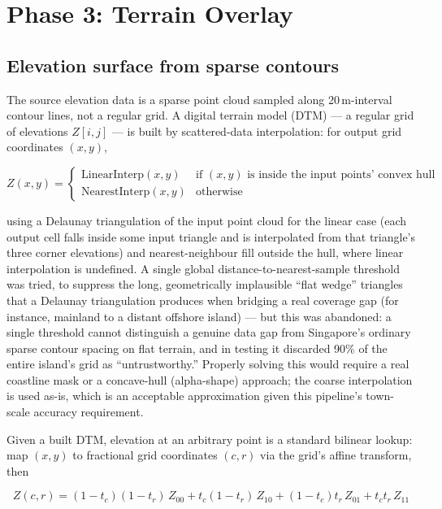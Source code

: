 \documentclass[11pt]{article}
\begin{document}
\section{Phase 3: Terrain Overlay}
\label{sec:terrain}

\subsection{Elevation surface from sparse contours}

The source elevation data is a sparse point cloud sampled along 20\,m-interval contour lines,
not a regular grid. A digital terrain model (DTM) --- a regular grid of elevations
$Z[i,j]$ --- is built by scattered-data interpolation: for output grid coordinates $(x,y)$,

\begin{equation}
  Z(x,y) = \begin{cases}
    \mathrm{LinearInterp}(x,y) & \text{if } (x,y) \text{ is inside the input points' convex hull} \\
    \mathrm{NearestInterp}(x,y) & \text{otherwise}
  \end{cases}
\end{equation}

using a Delaunay triangulation of the input point cloud for the linear case (each output cell
falls inside some input triangle and is interpolated from that triangle's three corner
elevations) and nearest-neighbour fill outside the hull, where linear interpolation is
undefined. A single global distance-to-nearest-sample threshold was tried, to suppress the
long, geometrically implausible ``flat wedge'' triangles that a Delaunay triangulation
produces when bridging a real coverage gap (for instance, mainland to a distant offshore
island) --- but this was abandoned: a single threshold cannot distinguish a genuine data gap
from Singapore's ordinary sparse contour spacing on flat terrain, and in testing it discarded
90\% of the entire island's grid as ``untrustworthy.'' Properly solving this would require a
real coastline mask or a concave-hull (alpha-shape) approach; the coarse interpolation is used
as-is, which is an acceptable approximation given this pipeline's town-scale accuracy
requirement.

Given a built DTM, elevation at an arbitrary point is a standard bilinear lookup: map
$(x,y)$ to fractional grid coordinates $(c,r)$ via the grid's affine transform, then

\begin{equation}
  Z(c,r) = (1-t_c)(1-t_r)\,Z_{00} + t_c(1-t_r)\,Z_{10} + (1-t_c)t_r\,Z_{01} + t_c t_r\,Z_{11}
\end{equation}
\end{document}

